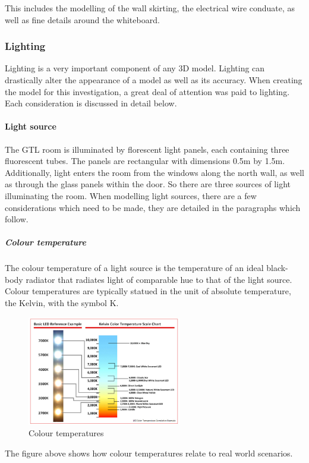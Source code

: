 \documentclass[11pt,a4paper]{report}
\begin{document}
				This includes the modelling of the wall skirting, the electrical wire conduate, as well as fine details around the whiteboard. 
				
			\subsubsection{Lighting}
				Lighting is a very important component of any 3D model. Lighting can drastically alter the appearance of a model as well as its accuracy. When creating the model for this investigation, a great deal of attention was paid to lighting. Each consideration is discussed in detail below.
				
				\paragraph{Light source}
					The GTL room is illuminated by florescent light panels, each containing three fluorescent tubes. The panels are rectangular with dimensions 0.5m by 1.5m. Additionally, light enters the room from the windows along the north wall, as well as through the glass panels within the door. So there are three sources of light illuminating the room. When modelling light sources, there are a few considerations which need to be made, they are detailed in the paragraphs which follow.
					\subparagraph{Colour temperature}
						The colour temperature of a light source is the temperature of an ideal black-body radiator that radiates light of comparable hue to that of the light source. Colour temperatures are typically statued in the unit of absolute temperature, the Kelvin, with the symbol K.
						\begin{figure}[h!]
							\centering
							\includegraphics[width=0.6\textwidth]{colour_temperature}
							\caption{Colour temperatures}
						\end{figure}
						The figure above shows how colour temperatures relate to real world scenarios.
				
\end{document}
